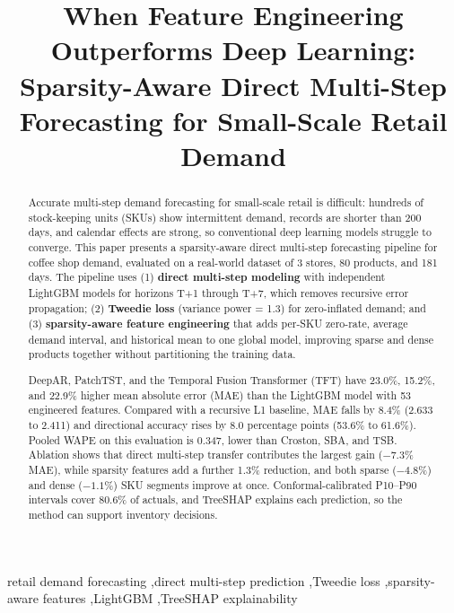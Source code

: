 \documentclass[review,authoryear]{elsarticle}
\begin{document}
\begin{frontmatter}

\title{When Feature Engineering Outperforms Deep Learning: Sparsity-Aware Direct Multi-Step Forecasting for Small-Scale Retail Demand}

\begin{abstract}

Accurate multi-step demand forecasting for small-scale retail is difficult: hundreds of stock-keeping units (SKUs) show intermittent demand, records are shorter than 200 days, and calendar effects are strong, so conventional deep learning models struggle to converge. This paper presents a sparsity-aware direct multi-step forecasting pipeline for coffee shop demand, evaluated on a real-world dataset of 3 stores, 80 products, and 181 days. The pipeline uses (1) \textbf{direct multi-step modeling} with independent LightGBM models for horizons T+1 through T+7, which removes recursive error propagation; (2) \textbf{Tweedie loss} (variance power = 1.3) for zero-inflated demand; and (3) \textbf{sparsity-aware feature engineering} that adds per-SKU zero-rate, average demand interval, and historical mean to one global model, improving sparse and dense products together without partitioning the training data.

DeepAR, PatchTST, and the Temporal Fusion Transformer (TFT) have 23.0\%, 15.2\%, and 22.9\% higher mean absolute error (MAE) than the LightGBM model with 53 engineered features. Compared with a recursive L1 baseline, MAE falls by 8.4\% (2.633 to 2.411) and directional accuracy rises by 8.0 percentage points (53.6\% to 61.6\%). Pooled WAPE on this evaluation is 0.347, lower than Croston, SBA, and TSB. Ablation shows that direct multi-step transfer contributes the largest gain ($-7.3$\% MAE), while sparsity features add a further 1.3\% reduction, and both sparse ($-4.8$\%) and dense ($-1.1$\%) SKU segments improve at once. Conformal-calibrated P10--P90 intervals cover 80.6\% of actuals, and TreeSHAP explains each prediction, so the method can support inventory decisions.

\end{abstract}

\begin{keyword}
retail demand forecasting \sep direct multi-step prediction \sep Tweedie loss \sep sparsity-aware features \sep LightGBM \sep TreeSHAP explainability
\end{keyword}

\end{frontmatter}
\end{document}
